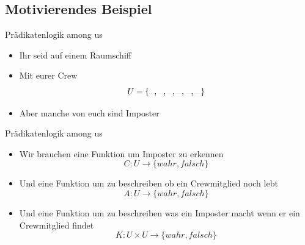 \subsection{Motivierendes Beispiel}
\begin{frame}[fragile]{Prädikatenlogik among us}
    \begin{itemize}
        \item<1-> Ihr seid auf einem Raumschiff
        \item<2-> Mit eurer Crew 
        $$
        U = \{\sus{red}, \sus{green}, \sus{blue}, \sus{white}, \sus{yellow}, \sus{magenta}\}
        $$
        \item<3-> Aber manche von euch sind Imposter
        
    \end{itemize}
\end{frame}

\begin{frame}[fragile]{Prädikatenlogik among us}
    \begin{itemize}
        \item<1-> Wir brauchen eine Funktion um Imposter zu erkennen
        $$C: U \to \{wahr, falsch\}$$
        \item<2-> Und eine Funktion um zu beschreiben ob ein Crewmitglied noch lebt
        $$A: U \to \{wahr, falsch\}$$
        \item<3-> Und eine Funktion um zu beschreiben was ein Imposter macht wenn er ein Crewmitglied findet
        $$K: U\times U \to \{wahr, falsch\}$$
    \end{itemize}
\end{frame}



